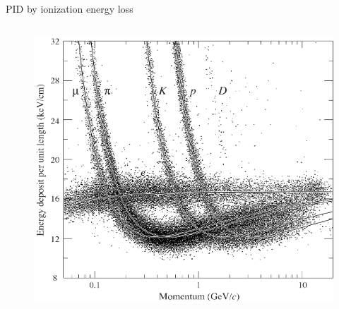 \documentclass{beamer}
\begin{document}
\begin{frame}{PID by ionization energy loss}
\begin{columns}
\begin{column}{.5\textwidth}
\begin{figure}
    \includegraphics[width=\textwidth]{plots/pep_pid.png}
    \end{figure}
  \end{column}
\end{columns}
\end{frame}
\end{document}
